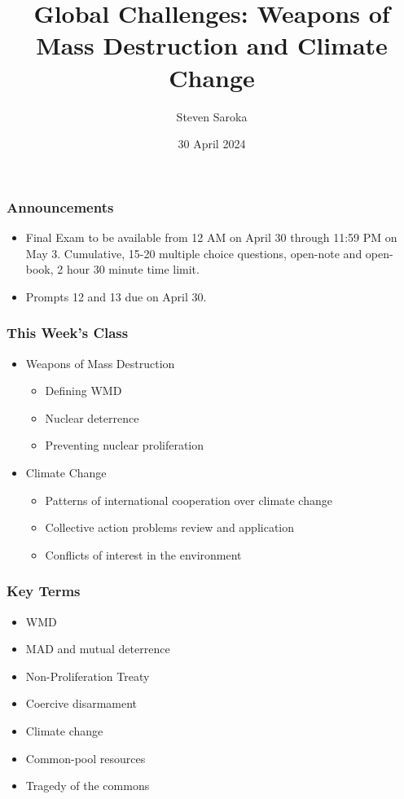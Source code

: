\documentclass{beamer}
\title[Global Challenges]{\LARGE{Global Challenges: Weapons of Mass Destruction and Climate Change}}
\author[POLI 150]{Steven Saroka}
\institute{POLI 150}
\date{30 April 2024}
\begin{document}
\begin{frame}
\titlepage %
\end{frame}



\begin{frame} 
	\frametitle{\LARGE{Announcements}}
	\begin{itemize}
		\item Final Exam to be available from 12 AM on April 30 through 11:59 PM on May 3. Cumulative, 15-20 multiple choice questions, open-note and open-book, 2 hour 30 minute time limit.
		\item Prompts 12 and 13 due on April 30.
	\end{itemize}
\end{frame}

\begin{frame} 
	\frametitle{\LARGE{This Week's Class}}
	\begin{itemize}
		\item Weapons of Mass Destruction
			\begin{itemize}
			\item Defining WMD

			\item Nuclear deterrence

			\item Preventing nuclear proliferation 
			\end{itemize}
		\item Climate Change
			\begin{itemize}
			\item Patterns of international cooperation over climate change  
			
			\item Collective action problems review and application 
			
			\item Conflicts of interest in the environment 
		\end{itemize}
	\end{itemize}
\end{frame}


\begin{frame} 
	\frametitle{\LARGE{Key Terms}}
	\begin{itemize}
		\item WMD 
		\item MAD and mutual deterrence
		\item Non-Proliferation Treaty
		\item Coercive disarmament
		\item Climate change
		\item Common-pool resources
		\item Tragedy of the commons
		
	\end{itemize}
\end{frame}
\end{document}
